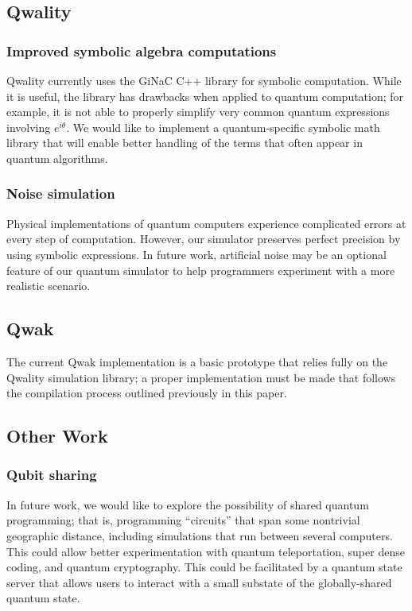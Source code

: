 \documentclass{article}
\begin{document}
\subsection{Qwality}

\subsubsection{Improved symbolic algebra computations}

Qwality currently uses the GiNaC C++ library for symbolic computation. While it is useful, the library has drawbacks when applied to quantum computation; for example, it is not able to properly simplify very common quantum expressions involving $e^{i\theta}$. We would like to implement a quantum-specific symbolic math library that will enable better handling of the terms that often appear in quantum algorithms.

\subsubsection{Noise simulation}
Physical implementations of quantum computers experience complicated errors at every step of computation. However, our simulator preserves perfect precision by using symbolic expressions. In future work, artificial noise may be an optional feature of our quantum simulator to help programmers experiment with a more realistic scenario.

\subsection{Qwak}

The current Qwak implementation is a basic prototype that relies fully on the Qwality simulation library; a proper implementation must be made that follows the compilation process outlined previously in this paper.

\subsection{Other Work}

\subsubsection{Qubit sharing}

In future work, we would like to explore the possibility of shared quantum programming; that is, programming ``circuits'' that span some nontrivial geographic distance, including simulations that run between several computers. This could allow better experimentation with quantum teleportation, super dense coding, and quantum cryptography. This could be facilitated by a quantum state server that allows users to interact with a small substate of the globally-shared quantum state.
\end{document}
